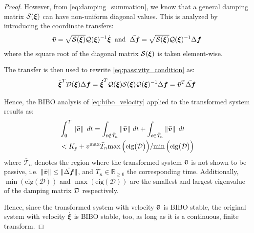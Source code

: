 \begin{proof}
However, from \eqref{eq:damping_summation}, we know that a general damping matrix $\mathcal{S}(\boldsymbol{\xi})$ can have non-uniform diagonal values. This is analyzed by introducing the coordinate transfers:
\begin{equation}
	\boldsymbol{\bar{v}} = \sqrt{\mathcal{S}({\boldsymbol{\xi}})} \mathcal{Q}({\boldsymbol{\xi}})^{-1} \dot{{\boldsymbol{\xi}}}
	\;\; \text{and} \;\;
	\bar{\Delta \boldsymbol{f}} = \sqrt{\mathcal{S}({\boldsymbol{\xi}})} \mathcal{Q}({\boldsymbol{\xi}})^{-1} \Delta \boldsymbol{f}
\end{equation}
where the square root of the diagonal matrix $\mathcal{S}({\boldsymbol{\xi}})$ is taken element-wise.

The transfer is then used to rewrite \eqref{eq:passivity_condition} as:
\begin{equation}
\dot{\boldsymbol{\xi}}^T \mathcal{D}({\boldsymbol{\xi}}) \Delta \boldsymbol{f} = \boldsymbol{\dot \xi}^T \mathcal{Q}({\boldsymbol{\xi}}) \mathcal{S}({\boldsymbol{\xi}}) \mathcal{Q}({\boldsymbol{\xi}})^{-1} \Delta \boldsymbol{f} = \boldsymbol{\bar v}^T \bar{\Delta \boldsymbol{f}}
\end{equation}

Hence, the BIBO analysis of \eqref{eq:bibo_velocity} applied to the transformed system results as:
\begin{equation}
\begin{split}
	  & \int_{0}^{T} \left\| \boldsymbol{\bar v} \right\| \; dt   
	   = \int_{t \notin \bar{\mathcal{T}}_n} \left\| \boldsymbol{\bar v} \right\|  \, dt + \int_{t \in  \bar{\mathcal{T}}_n} \left\| \boldsymbol{\bar v} \right\| \;  dt  \\ 
   & < K_p + v^{\mathrm{max}} \bar T_n 
   {\max{\Bigl(\text{eig}\bigl(\mathcal{D} \bigr) \Bigr)}} 
   / {\min{\Bigl(\text{eig}\bigl(\mathcal{D} \bigr) \Bigr)}}
\end{split}
\end{equation}
where $\bar{\mathcal{T}}_n$ denotes the region where the transformed system $\boldsymbol{\bar v}$ is not shown to be passive, i.e. $\| \boldsymbol{\bar v} \| \leq \| \bar{\Delta \boldsymbol{f}} \|$, and $\bar T_n \in \mathbb{R}_{\geq 0}$ the corresponding time. Additionally, $\min{(\text{eig}(\mathcal{D}))}$ and $\max{(\text{eig}(\mathcal{D}))}$ are the smallest and largest eigenvalue of the damping matrix $\mathcal{D}$ respectively.

Hence, since the transformed system with velocity $\boldsymbol{\bar v}$ is BIBO stable, the original system with velocity $\dot{\boldsymbol{\xi}}$ is BIBO stable, too, as long as it is a continuous, finite transform. 
\end{proof}

